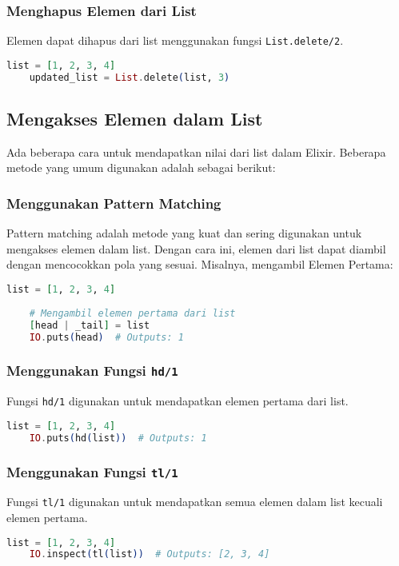 \subsubsection{Menghapus Elemen dari List}
Elemen dapat dihapus dari list menggunakan fungsi \texttt{List.delete/2}.
\begin{lstlisting}[language=Elixir]
	list = [1, 2, 3, 4]
	updated_list = List.delete(list, 3)
\end{lstlisting}

\subsection{Mengakses Elemen dalam List}
Ada beberapa cara untuk mendapatkan nilai dari list dalam Elixir. Beberapa metode yang umum digunakan adalah sebagai berikut:

\subsubsection{Menggunakan Pattern Matching}
Pattern matching adalah metode yang kuat dan sering digunakan untuk mengakses elemen dalam list. Dengan cara ini, elemen dari list dapat diambil dengan mencocokkan pola yang sesuai. Misalnya, mengambil Elemen Pertama:
\begin{lstlisting}[language=Elixir]
	list = [1, 2, 3, 4]
	
	# Mengambil elemen pertama dari list
	[head | _tail] = list
	IO.puts(head)  # Outputs: 1
\end{lstlisting}

\subsubsection{Menggunakan Fungsi \texttt{hd/1}}
Fungsi \texttt{hd/1} digunakan untuk mendapatkan elemen pertama dari list.

\begin{lstlisting}[language=Elixir]
	list = [1, 2, 3, 4]
	IO.puts(hd(list))  # Outputs: 1
\end{lstlisting}

\subsubsection{Menggunakan Fungsi \texttt{tl/1}}
Fungsi \texttt{tl/1} digunakan untuk mendapatkan semua elemen dalam list kecuali elemen pertama.

\begin{lstlisting}[language=Elixir]
	list = [1, 2, 3, 4]
	IO.inspect(tl(list))  # Outputs: [2, 3, 4]
\end{lstlisting}

